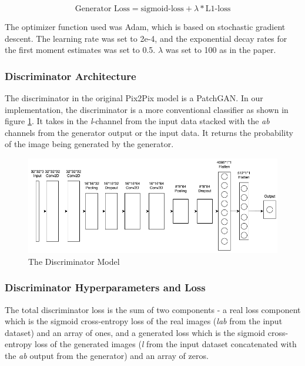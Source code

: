\documentclass{article}
\begin{document}
\begin{equation} \label{eqn:gan-loss}
  \text{Generator Loss} = \text{sigmoid-loss} + \lambda * \text{L1-loss}
\end{equation}

The optimizer function used was Adam, which is based on stochastic gradient
descent. The learning rate was set to 2e-4, and the exponential decay rates for
the first moment estimates was set to 0.5. $\lambda$ was set to 100 as in the
paper.

\subsubsection{Discriminator Architecture}

The discriminator in the original Pix2Pix model is a PatchGAN. In our
implementation, the discriminator is a more conventional classifier as shown in
figure \ref{fig:discriminator-model}. It takes in the \textit{l}-channel from
the input data stacked with the \textit{ab} channels from the generator output
or the input data. It returns the probability of the image being generated by
the generator.

\begin{figure}[h]
  \centering
  \includegraphics[width=\textwidth]{Discriminator.png}
  \caption{The Discriminator Model}
  \label{fig:discriminator-model}
  \centering
\end{figure}

\subsubsection{Discriminator Hyperparameters and Loss}

The total discriminator loss is the sum of two components - a real loss
component which is the sigmoid cross-entropy loss of the real images
(\textit{lab} from the input dataset) and an array of ones, and a generated loss
which is the sigmoid cross-entropy loss of the generated images (\textit{l} from
the input dataset concatenated with the \textit{ab} output from the generator)
and an array of zeros.
\end{document}

